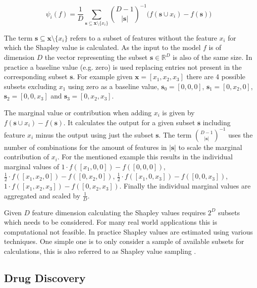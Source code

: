 \documentclass[../main.tex]{subfiles}
\begin{document}
\begin{equation}    
    \psi_{i}(f) = \frac{1}{D} \sum_{\mathbf{s}\subseteq \mathbf{x} \setminus \{x_i\}} \binom{D - 1}{|\mathbf{s}|}^{-1} \Big( f(\mathbf{s} \cup x_i ) - f(\mathbf{s}) \Big)
\end{equation}

The term $\mathbf{s} \subseteq \mathbf{x} \setminus \{x_i\}$ refers to a subset of features without the feature $x_i$ for which the Shapley value is calculated. As the input to the model $f$ is of dimension $D$ the vector representing the subset $\mathbf{s} \in \mathbb{R}^D$ is also of the same size. In practice a baseline value (e.g. zero) is used replacing entries not present in the corresponding subset $\mathbf{s}$. For example given $\mathbf{x}=[x_1, x_2, x_3]$ there are 4 possible subsets excluding $x_1$ using zero as a baseline value, $\mathbf{s}_0 = [0, 0, 0]$,  $\mathbf{s}_1 = [0, x_2, 0]$, $\mathbf{s}_2 = [0, 0, x_3]$ and $\mathbf{s}_3 = [0, x_2, x_3]$. 
\newline

The marginal value or contribution when adding $x_i$ is given by $f(\mathbf{s} \cup  x_i ) - f(\mathbf{s})$. It calculates the output for a given subset $\mathbf{s}$ including feature $x_i$ minus the output using just the subset $\mathbf{s}$. The term $\binom{D - 1}{|\mathbf{s}|}^{-1}$ uses the number of combinations for the amount of features in $|\mathbf{s}|$ to scale the marginal contribution of $x_i$. For the mentioned example this results in the individual marginal values of $1 \cdot f([x_1, 0, 0]) - f([0, 0, 0])$, $\frac{1}{2} \cdot f([x_1, x_2, 0]) - f([0, x_2, 0])$, $\frac{1}{2} \cdot f([x_1, 0, x_3]) - f([0, 0, x_3])$, $1 \cdot f([x_1, x_2, x_3]) - f([0, x_2, x_3])$. Finally the individual marginal values are aggregated and scaled by $\frac{1}{D}$. 

Given $D$ feature dimension calculating the Shapley values requires $2^D$ subsets which needs to be considered. For many real world applications this is computational not feasible. In practice Shapley values are estimated using various techniques. One simple one is to only consider a sample of available subsets for calculations, this is also referred to as Shapley value sampling \cite{castro_polynomial_2009}.

\subsection{Drug Discovery} \label{ssec:drug_discovery}
\end{document}
